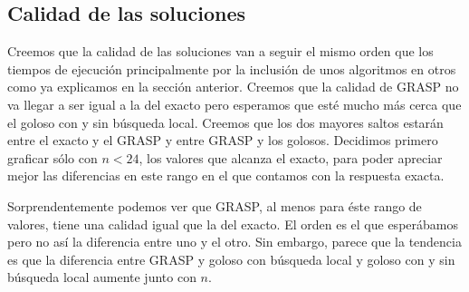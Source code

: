\subsection{Calidad de las soluciones}
Creemos que la calidad de las soluciones van a seguir el mismo orden que los tiempos de ejecución
principalmente por la inclusión de unos algoritmos en otros como ya explicamos en la sección anterior.
Creemos que la calidad de GRASP no va llegar a ser igual a la del exacto pero esperamos
que esté mucho más cerca que el goloso con y sin búsqueda local. Creemos que los dos mayores saltos
estarán entre el exacto y el GRASP y entre GRASP y los golosos.
Decidimos primero graficar sólo con $n < 24$, los valores que alcanza el exacto, para poder apreciar
mejor las diferencias en este rango en el que contamos con la respuesta exacta.
\begin{figure}[H]
    \begin{minipage}[t]{\linewidth}
		\centering
		\label{fig:ejercicio-6-comparacion-calidad}
    \end{minipage}
\end{figure}

Sorprendentemente podemos ver que GRASP, al menos para éste rango de valores, tiene una calidad
igual que la del exacto. El orden es el que esperábamos pero no así la diferencia entre uno y el otro.
Sin embargo, parece que la tendencia es que la diferencia entre GRASP y goloso con búsqueda local y
goloso con y sin búsqueda local aumente junto con $n$.

